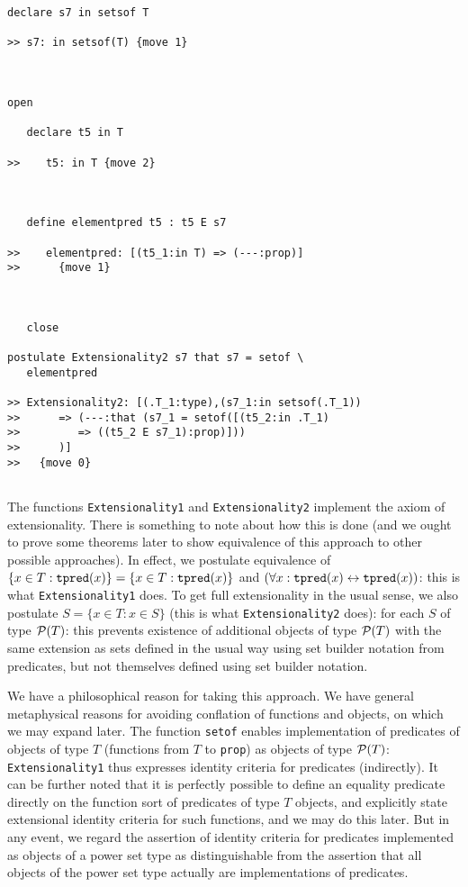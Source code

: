 \documentclass[12pt]{article}
\begin{document}
\begin{verbatim}
declare s7 in setsof T

>> s7: in setsof(T) {move 1}



open

   declare t5 in T

>>    t5: in T {move 2}



   define elementpred t5 : t5 E s7

>>    elementpred: [(t5_1:in T) => (---:prop)]
>>      {move 1}



   close

postulate Extensionality2 s7 that s7 = setof \
   elementpred

>> Extensionality2: [(.T_1:type),(s7_1:in setsof(.T_1))
>>      => (---:that (s7_1 = setof([(t5_2:in .T_1)
>>         => ((t5_2 E s7_1):prop)]))
>>      )]
>>   {move 0}


\end{verbatim}

The functions {\tt Extensionality1} and {\tt Extensionality2} implement the axiom of extensionality.  There is something to note about how this is done (and we ought to prove some theorems later to show equivalence of this approach to other possible approaches).  In effect, we postulate
equivalence of $\{x \in T:{\tt tpred}(x)\} = \{x \in T:{\tt tpred}(x)\}$ and $(\forall x:{\tt tpred}(x) \leftrightarrow {\tt tpred}(x))$:  this is what {\tt Extensionality1} does.  To get full extensionality in the usual sense, we also postulate $S = \{x \in T:x \in S\}$ (this is what {\tt Extensionality2} does):  for each $S$ of type ${\cal P}(T)$:  this prevents existence of additional objects
of type ${\cal P}(T)$ with the same extension as sets defined in the usual way using set builder notation from predicates, but not themselves defined using set builder notation.

We have a philosophical reason for taking this approach.  We have general metaphysical reasons for avoiding conflation of functions and objects,
on which we may expand later.  The function {\tt setof} enables implementation of predicates of objects of type $T$ (functions from $T$ to {\tt prop}) as objects of type ${\cal P}(T)$:  {\tt Extensionality1} thus expresses identity criteria for predicates (indirectly).  It can be further noted that it is perfectly possible to define an equality predicate directly on the function sort of predicates of type $T$ objects, and explicitly state extensional identity criteria for such functions, and we may do this later.  But in any event, we regard the assertion of identity criteria for predicates implemented as objects of a power set type as distinguishable from the assertion that all objects of the power set type actually are implementations of predicates.
\end{document}
